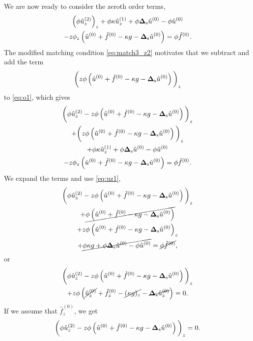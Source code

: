 \documentclass[11pt,b5paper,DIV=calc,BCOR1.3cm,headings=small,%
               footinclude=false,headsepline]{scrbook}
\newcommand*{\lapls}{\boldsymbol\Delta_{\text s}}
\begin{document}
We are now ready to consider the zeroth order terms,
\begin{multline}
  \label{eq:o1}
  \left(\phi\hat u^{(2)}_z\right)_z
  + \phi\kappa\hat u_z^{(1)}
  + \phi\lapls \hat u^{(0)}
  - \phi\hat u^{(0)} \\
  - z\phi_z\left(\hat u^{(0)}
      + \hat f^{(0)} - \kappa g - \lapls\hat u^{(0)}\right)
  = \phi \hat f^{(0)}.
\end{multline}
The modified matching condition \eqref{eq:match3_z2} motivates that we subtract
and add the term
\[
  \bigg(z\phi\left(\hat u^{(0)} + \hat f^{(0)} - \kappa g
    - \lapls \hat u^{(0)}\right)\bigg)_z
\]
to \eqref{eq:o1}, which gives
\begin{multline}
  \bigg(\phi\hat u_z^{(2)}
    - z\phi\left(\hat u^{(0)} + \hat f^{(0)} - \kappa g
    - \lapls \hat u^{(0)}\right)\bigg)_z \\
  + \bigg(z\phi\left(\hat u^{(0)} + \hat f^{(0)} - \kappa g
    - \lapls \hat u^{(0)}\right)\bigg)_z \\
  + \phi\kappa\hat u_z^{(1)}
  + \phi\lapls \hat u^{(0)}
  - \phi\hat u^{(0)} \\
  - z\phi_z\left(\hat u^{(0)}
      + \hat f^{(0)} - \kappa g - \lapls\hat u^{(0)}\right)
  = \phi \hat f^{(0)}.
\end{multline}
We expand the terms and use \eqref{eq:uz1},
\begin{multline}
  \bigg(\phi\hat u_z^{(2)}
    - z\phi\left(\hat u^{(0)} + \hat f^{(0)} - \kappa g
    - \lapls \hat u^{(0)}\right)\bigg)_z \\
  + \cancel{\phi\left(\hat u^{(0)} + \hat f^{(0)} - \kappa g
    - \lapls \hat u^{(0)}\right)} \\
  + z\phi\left(\hat u^{(0)} + \hat f^{(0)} - \kappa g
    - \lapls \hat u^{(0)}\right)_z \\
  + \cancel{\phi\kappa g
  + \phi\lapls \hat u^{(0)}
  - \phi\hat u^{(0)}}
  = \cancel{\phi \hat f^{(0)}},
  \label{eq:o2}
\end{multline}
or
\begin{multline}
  \bigg(\phi\hat u_z^{(2)}
    - z\phi\left(\hat u^{(0)} + \hat f^{(0)} - \kappa g
    - \lapls \hat u^{(0)}\right)\bigg)_z \\
  + z\phi\left(\cancel{\hat u_z^{(0)}} + \hat f_z^{(0)}
      - \cancel{(\kappa g)_z}
      - \cancel{\lapls \hat u_z^{(0)}}\right) = 0.
\end{multline}
If we assume that $\hat f_z^{(0)}$, we get
\begin{equation}
  \bigg(\phi\hat u_z^{(2)}
    - z\phi\left(\hat u^{(0)} + \hat f^{(0)} - \kappa g
    - \lapls \hat u^{(0)}\right)\bigg)_z = 0.
  \label{eq:o3}
\end{equation}
\end{document}
